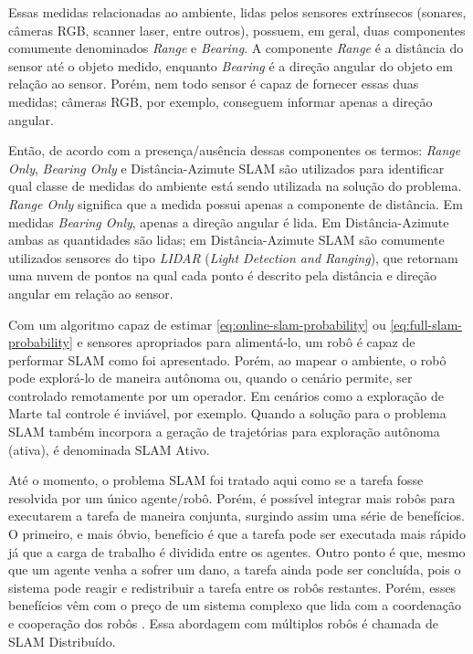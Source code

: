 Essas medidas relacionadas ao ambiente, lidas pelos sensores extrínsecos 
(sonares, câmeras RGB, scanner laser, entre outros), possuem, em geral, duas 
componentes comumente denominados \textit{Range} e \textit{Bearing}. 
A componente \textit{Range} é a distância do sensor até o objeto medido, 
enquanto \textit{Bearing} é a direção angular do objeto em relação ao sensor. 
Porém, nem todo sensor é capaz de fornecer essas duas medidas; câmeras RGB, por 
exemplo, conseguem  informar apenas a direção angular.

Então, de acordo com a presença/ausência dessas componentes os termos: 
\textit{Range Only}, \textit{Bearing Only} e Distância-Azimute SLAM são 
utilizados para identificar qual classe de medidas do ambiente está sendo
utilizada na solução do problema. \textit{Range Only} significa que a medida 
possui apenas a 
componente de distância. Em medidas \textit{Bearing Only}, apenas a direção 
angular é lida. Em Distância-Azimute ambas as quantidades são lidas; em 
Distância-Azimute SLAM são comumente utilizados sensores do tipo 
\emph{LIDAR} (\textit{Light Detection and Ranging}), que retornam uma nuvem de 
pontos na qual cada ponto é descrito pela distância e direção angular em relação ao 
sensor.

Com um algoritmo capaz de estimar \ref{eq:online-slam-probability} ou 
\ref{eq:full-slam-probability} e sensores apropriados para alimentá-lo, 
um robô é capaz de performar SLAM como foi apresentado. Porém, ao mapear 
o ambiente, o robô pode explorá-lo de maneira autônoma ou, quando 
o cenário permite, ser controlado remotamente por um operador. Em cenários 
como a exploração de Marte tal controle é inviável, por exemplo. Quando a 
solução para o problema SLAM também incorpora a geração de trajetórias para exploração autônoma (ativa), é denominada SLAM Ativo.

Até o momento, o problema SLAM foi tratado aqui como se a tarefa fosse resolvida 
por um único agente/robô. Porém, é possível integrar mais robôs para executarem 
a tarefa de maneira conjunta, surgindo assim uma série de benefícios. O primeiro, 
e mais óbvio, benefício é que a tarefa pode ser executada mais rápido já que a 
carga de trabalho é dividida entre os agentes. Outro ponto é que, mesmo que um 
agente venha a sofrer um dano, a tarefa ainda pode ser concluída, pois o sistema 
pode reagir e redistribuir a tarefa entre os robôs restantes. Porém, esses 
benefícios vêm com o preço de um sistema complexo que lida com a 
coordenação e cooperação dos robôs \cite{saeedi2016multiple}. Essa abordagem com 
múltiplos robôs é chamada de SLAM Distribuído.


